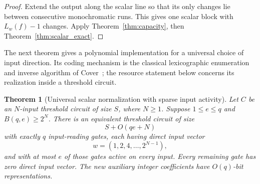 \documentclass[11pt]{article}
\newtheorem{theorem}{Theorem}[section]
\theoremstyle{definition}
\begin{document}
\begin{proof}
Extend the output along the scalar line so that its only changes lie between consecutive monochromatic runs. This gives one scalar block with \(L_w(f)-1\) changes. Apply Theorem~\ref{thm:capacity}, then Theorem~\ref{thm:scalar_exact}.
\end{proof}

The next theorem gives a polynomial implementation for a universal choice of input direction. Its coding mechanism is the classical lexicographic enumeration and inverse algorithm of Cover~\cite{Cover73}; the resource statement below concerns its realization inside a threshold circuit.

\begin{theorem}[Universal scalar normalization with sparse input activity]\label{thm:scalar_universal}
Let \(C\) be an \(N\)-input threshold circuit of size \(S\), where \(N\ge1\). Suppose \(1\le e\le q\) and \(B(q,e)\ge2^N\). There is an equivalent threshold circuit of size
\[
 S+O(qe+N)
\]
with exactly \(q\) input-reading gates, each having direct input vector
\[
 w=(1,2,4,\ldots,2^{N-1}),
\]
and with at most \(e\) of those gates active on every input. Every remaining gate has zero direct input vector. The new auxiliary integer coefficients have \(O(q)\)-bit representations.
\end{theorem}
\end{document}
